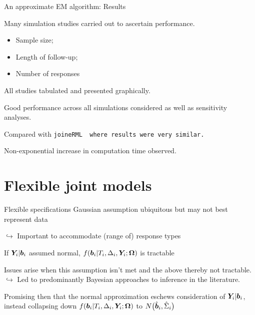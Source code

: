 \documentclass[10pt]{beamer}
\begin{document}
\begin{frame}{An approximate EM algorithm: Results}

Many simulation studies carried out to ascertain performance.

\begin{itemize}
    \item Sample size;
    \item Length of follow-up;
    \item Number of responses \etc
\end{itemize}
All studies tabulated and presented graphically.

\vspace{3mm}

Good performance across all simulations considered as well as sensitivity analyses.\\

\vspace{3mm}

Compared with \tt{joineRML} \cite{Hickey2018} where results were very similar.\\

\vspace{3mm}

Non-exponential increase in computation time observed.
    
\end{frame}

\section{Flexible joint models}
\begin{frame}{Flexible specifications}
    Gaussian assumption ubiquitous but may not best represent data\\

    \vspace{1mm}

    $\hookrightarrow$ Important to accommodate (range of) response types\\

    \vspace{5mm}

    If $\bm{Y}_i|\bm{b}_i$ assumed normal, $f\!\left(\bm{b}_i|T_i,\Delta_i,\bm{Y}_i;\bm{\mathrm{\Omega}}\right)$ is tractable\\

    \vspace{5mm}

    Issues arise when this assumption isn't met and the above thereby not tractable.\\
    \vspace{1mm}
    $\hookrightarrow$ Led to predominantly Bayesian approaches to inference in the literature.\\

    \vspace{5mm}

    Promising then that the normal approximation eschews consideration of $\bm{Y}_i|\bm{b}_i$, instead collapsing down $f\!\left(\bm{b}_i|T_i,\Delta_i,\bm{Y}_i;\bm{\mathrm{\Omega}}\right)$ to $N\big(\hat{\bm{b}}_i,\hat{\Sigma}_i\big)$
    
\end{frame}
\end{document}
